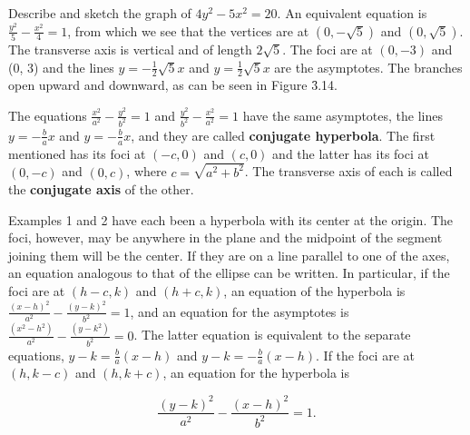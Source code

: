 \begin{example}
Describe and sketch the graph of $4y^2 - 5x^2 = 20$. An equivalent equation is $\frac{y^2}{5} - \frac{x^2}{4} = 1$, from which we see that the vertices are at $(0, -\sqrt5)$ and $(0, \sqrt5)$. The transverse axis is vertical and of length $2\sqrt{5}$. The foci are at $(0, -3)$ and (0, 3) and the lines $y = -\frac{1}{2}\sqrt{5}x$ and $y = \frac{1}{2}\sqrt{5}x$ are the asymptotes. The branches open upward and downward, as can be seen in Figure \f{3.14}.


The equations $\frac{x^2}{a^2} - \frac{y^2}{b^2} = 1$ and $\frac{y^2}{b^2} - \frac{x^2}{a^2} = 1$ have the same asymptotes, the lines $y = -\frac{b}{a} x$ and $y = - \frac{b}{a} x$, and they are called \textbf{conjugate hyperbola}.
The first mentioned has its foci at $(-c, 0)$ and $(c, 0)$ and the latter has its foci at $(0, -c)$ and $(0, c)$, where $c = \sqrt{a^2 + b^2}$. The transverse axis of each is called the \textbf{conjugate axis} of the other.

Examples 1 and 2 have each been a hyperbola with its center at the origin. The foci, however, may be anywhere in the plane and the midpoint of the segment joining them will be the center. If they are on a line parallel to one of the axes, an equation analogous to that of the ellipse can be written. In particular, if the foci are at $(h - c, k)$ and $(h + c, k)$, an equation of the hyperbola is $\frac{(x - h)^2}{a^2} - \frac{(y - k)^2}{b^2} = 1$, and an equation for the asymptotes is $ \frac{(x^2 - h^2)}{a^2}  - \frac{(y - k^2)}{b^2} = 0$.  The latter equation is equivalent to the separate equations, $y - k = \frac{b}{a} (x - h)$ and $y - k = - \frac{b}{a} (x - h)$. If the foci are at $(h, k - c)$ and $(h, k + c)$, an equation for the hyperbola is

$$
\frac{(y - k)^2}{a^2} - \frac{ (x - h)^2}{b^2} = 1. 
$$
\end{example}
\medskip


